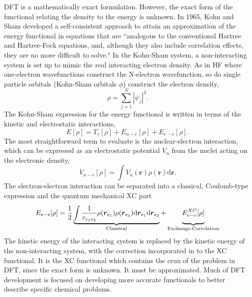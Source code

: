 \ac{DFT} is a mathematically exact formulation. However, the exact form of the functional relating the density to the energy is unknown. In 1965, Kohn and Sham developed a self-consistent approach to attain an approximation of the energy functional in equations that are ``analogous to the conventional Hartree and Hartree-Fock equations, and, although they also include correlation effects, they are no more difficult to solve."\cite{Kohn1965} In the Kohn-Sham system, a non-interacting system is set up to mimic the real interacting electron density. As in \ac{HF} where one-electron wavefunctions construct the N-electron wavefunction, so do single particle orbitals (Kohn-Sham orbitals $\phi$) construct the electron density,
\begin{equation}
    \rho=\sum_{j=1}^{N}|\psi_{j}|^{2}.
\end{equation}
The Kohn-Sham expression for the energy functional is written in terms of the kinetic and electrostatic interactions,
\begin{equation}
    E[\rho]=T_{e}[\rho]+E_{n-e}[\rho]+E_{e-e}[\rho].
\end{equation}
The most straightforward term to evaluate is the nuclear-electron interaction, which can be expressed as an electrostatic potential $V_{n}$ from the nuclei acting on the electronic density, 
\begin{equation}
    V_{n-e}[\rho]=\int{V_{n}(\bm{r})\rho(\bm{r})\mathrm{d}\bm{r}}.
\end{equation}
The electron-electron interaction can be separated into a classical, Coulomb-type expression and the quantum mechanical \ac{XC} part
\begin{equation}
    E_{e-e}[\rho]=\frac{1}{2}\underbrace{\int{}\frac{1}{r_{e_{1}e_{2}}}\rho(\bm{r}_{e_{1}})\rho(\bm{r}_{e_{2}})\mathrm{d}\bm{r}_{e_{1}}\mathrm{d}\bm{r}_{e_{2}}}_\text{Classical}+\underbrace{\vphantom{ \left(\frac{a^{0.3}}{b}\right) }E_{e-e}^{XC}[\rho]}_\text{Exchange-Correlation}
\end{equation}
The kinetic energy of the interacting system is replaced by the kinetic energy of the non-interacting system, with the correction incorporated in to the \ac{XC} functional. It is the \ac{XC} functional which contains the crux of the problem in \ac{DFT}, since the exact form is unknown. It must be approximated. Much of \ac{DFT} development is focused on developing more accurate functionals to better describe specific chemical problems.

